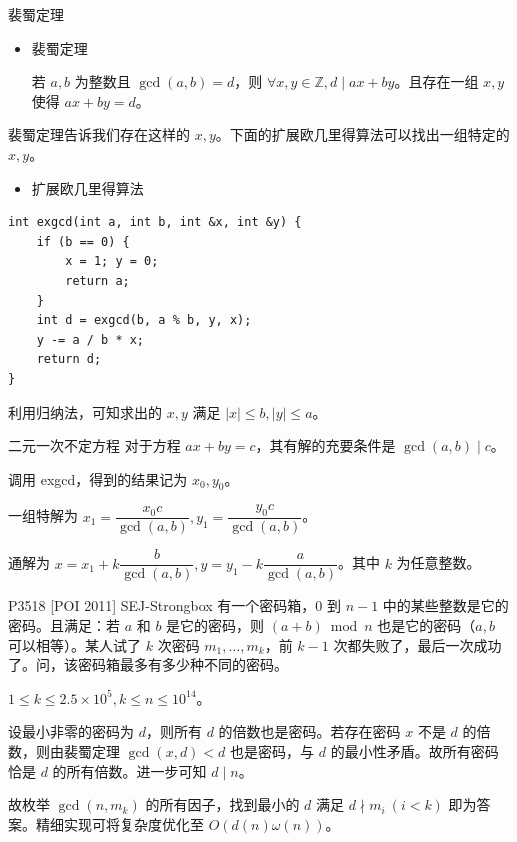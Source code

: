\documentclass [hyperref={bookmarksdepth=4}, aspectratio=169] {beamer}
\theoremstyle {fy}
\def\Z{\mathbb{Z}}
\begin{document}
\begin{frame}{裴蜀定理}
\begin{itemize}
    \item 裴蜀定理

  若 $a,b$ 为整数且 $\gcd(a,b)=d$，则 $\forall x,y\in\Z,d\mid ax+by$。且存在一组 $x,y$ 使得 $ax+by=d$。
\end{itemize}

裴蜀定理告诉我们存在这样的 $x,y$。下面的扩展欧几里得算法可以找出一组特定的 $x,y$。

\begin{itemize}
    \item 扩展欧几里得算法
\end{itemize}

\begin{lstlisting}
int exgcd(int a, int b, int &x, int &y) {
    if (b == 0) {
        x = 1; y = 0;
        return a;
    }
    int d = exgcd(b, a % b, y, x);
    y -= a / b * x;
    return d;
}
\end{lstlisting}

利用归纳法，可知求出的 $x,y$ 满足 $|x|\le b,|y|\le a$。
\end{frame}

\begin{frame}{二元一次不定方程}
对于方程 $ax+by=c$，其有解的充要条件是 $\gcd(a,b)\mid c$。

调用 exgcd，得到的结果记为 $x_0,y_0$。

一组特解为 $x_1=\dfrac{x_0c}{\gcd(a,b)},y_1=\dfrac{y_0c}{\gcd(a,b)}$。

通解为 $x=x_1+k\dfrac{b}{\gcd(a,b)},y=y_1-k\dfrac{a}{\gcd(a,b)}$。其中 $k$ 为任意整数。
\end{frame}

\begin{frame}{P3518 [POI 2011] SEJ-Strongbox}
有一个密码箱，$0$ 到 $n-1$ 中的某些整数是它的密码。且满足：若 $a$ 和 $b$ 是它的密码，则 $(a+b)\bmod n$ 也是它的密码（$a,b$ 可以相等）。某人试了 $k$ 次密码 $m_1,\dots,m_k$，前 $k-1$ 次都失败了，最后一次成功了。问，该密码箱最多有多少种不同的密码。

$1\le k\le 2.5\times 10^5,k\le n\le 10^{14}$。

设最小非零的密码为 $d$，则所有 $d$ 的倍数也是密码。若存在密码 $x$ 不是 $d$ 的倍数，则由裴蜀定理 $\gcd(x,d)<d$ 也是密码，与 $d$ 的最小性矛盾。故所有密码恰是 $d$ 的所有倍数。进一步可知 $d\mid n$。

故枚举 $\gcd(n,m_k)$ 的所有因子，找到最小的 $d$ 满足 $d\nmid m_i\ (i<k)$ 即为答案。精细实现可将复杂度优化至 $O(d(n)\omega(n))$。
\end{frame}
\end{document}
